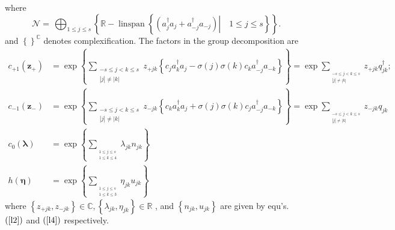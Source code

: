 \documentclass[aps,preprint]{revtex4}%
\begin{document}
where
\begin{equation}
\mathcal{N=\,}%
{\textstyle\bigoplus_{1\leq j\leq s}}
\left\{  \mathbb{R-}\operatorname{linspan}\left\{  \left.  \left(
a_{j}^{\dagger}a_{j}+a_{-j}^{\dagger}a_{-j}\right)  \right\vert \quad1\leq
j\leq s\right\}  \right\}  .
\end{equation}
and $\left\{  {}\right\}  ^{\mathbb{C}}$ denotes complexification. The factors
in the group decomposition are%
\begin{align}
c_{+1}\left(  \mathbf{z}_{+}\right)   &  =\exp\left\{  \sum
\limits_{\substack{-s\leq j<k\leq s\\\left\vert j\right\vert \neq\left\vert
k\right\vert }}z_{+jk}\left\{  c_{j}a_{k}^{\dagger}a_{j}-\sigma\left(
j\right)  \sigma\left(  k\right)  c_{k}a_{-j}^{\dagger}a_{-k}\right\}
\right\}  =\exp\sum\limits_{_{\substack{-s\leq j<k\leq s\\\left\vert
j\right\vert \neq\left\vert k\right\vert }}}z_{+jk}q_{jk}^{\dagger
};\label{co1}\\
c_{-1}\left(  \mathbf{z}_{-}\right)   &  =\exp\left\{  \sum
\limits_{\substack{-s\leq j<k\leq s\\\left\vert j\right\vert \neq\left\vert
k\right\vert }}z_{-jk}\left\{  c_{k}a_{k}^{\dagger}a_{j}+\sigma\left(
j\right)  \sigma\left(  k\right)  c_{j}a_{-j}^{\dagger}a_{-k}\right\}
\right\}  =\exp\sum\limits_{_{\substack{-s\leq j<k\leq s\\\left\vert
j\right\vert \neq\left\vert k\right\vert }}}z_{-jk}q_{jk}\label{co2}\\
c_{0}\left(  \mathbf{\lambda}\right)   &  =\exp\left\{  \sum
\limits_{_{\substack{1\leq j\leq s\\1\leq k\leq4}}}\lambda_{jk}n_{jk}\right\}
\label{co3}\\
h\left(  \mathbf{\eta}\right)   &  =\exp\left\{  \sum
\limits_{_{\substack{1\leq j\leq s\\1\leq k\leq3}}}\eta_{jk}u_{jk}\right\}
\label{co4}%
\end{align}
where $\left\{  z_{+jk},z_{-jk}\right\}  \in\mathbb{C},\left\{  \lambda
_{jk},\eta_{jk}\right\}  \in\mathbb{R}$ , and $\left\{  n_{jk},u_{jk}\right\}
$ are given by equ's. $\left(  \ref{l2}\right)  $ and $\left(  \ref{l4}%
\right)  $ respectively.
\end{document}
